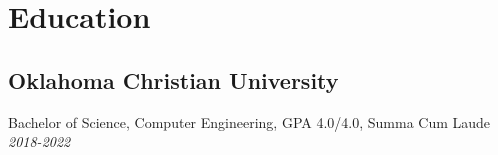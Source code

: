 \documentclass{article}
\begin{document}
\section{Education}
	\subsection{Oklahoma Christian University}
		Bachelor of Science, Computer Engineering, GPA 4.0/4.0, Summa Cum Laude \hfill \small{\textsl{2018-2022}}
\begin{comment}
		\subsection{Spring 2022}
			\begin{itemize}
				\item ELEC-3523 Digital Signal Processing
				\item CENG-4303 HDL Design of Microprocessors
				\item CENG-4753 Systems Design III
			\end{itemize}
		\subsection{Fall 2021}
			\begin{itemize}
				\item ELEC-4523 Software Engineering of Real-Time Systems
				\item CENG-4113 Software and Network Engineering
				\item CENG-4743 Systems Design II
			\end{itemize}
		\subsection{Spring 2021}
			\begin{itemize}
				\item CENG-3213 Computer Systems
				\item CENG-4223 Embedded Systems Design
				\item CENG-4213 Network Engineering
				\item ELEC-3313 Electronic Devices
				\item CMSC-4413 Operating Systems
				\item CENG-4732 Systems Design I
			\end{itemize}
		\subsection{Fall 2020}
			\begin{itemize}
				\item CENG-3203 Intro to Microprocessors
				\item ELEC-3504 Signals and Systems
				\item ELEC-3303 Analog Electronics
			\end{itemize}

\end{comment}
\end{document}
